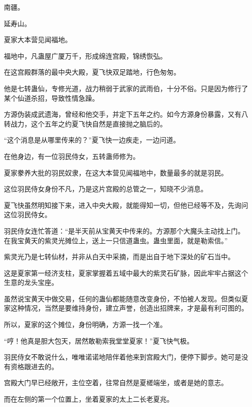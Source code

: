 
\begin{this_body}



南疆。

延寿山。

夏家大本营见闻福地。

福地中，凡蛊屋广厦万千，形成绵连宫殿，锦绣恢弘。

在这宫殿群落的最中央大殿，夏飞快双足踏地，行色匆匆。

他是七转蛊仙，专修光道，战力稍弱于武家的武雨伯，十分不俗。只是因为修行了某个仙道杀招，导致性情急躁。

方源伪装成武遗海，曾经和他交手，并定下五年之约。如今方源身份暴露，又有八转战力，这个五年之约夏飞快自然是直接抛之脑后的。

“这个消息是从哪里传来的？”夏飞快一边疾走，一边问道。

在他身边，有一位羽民侍女，五转蛊师修为。

夏家豢养大批的羽民奴隶，在这大本营见闻福地中，数量最多的就是羽民。

这位羽民侍女身份不凡，乃是这片宫殿的总管之一，知晓不少消息。

夏飞快虽然明知接下来，进入中央大殿，就能得知一切，但他已经等不及，先询问这位羽民侍女。

羽民侍女连忙答道：“是半天前从宝黄天中传来的。方源那个大魔头主动找上门。在我宝黄天的紫灵光摊位上，送上一只信道蛊虫。蛊虫里面，就是勒索信。”

紫灵光乃是七转仙材，并非从白天中采摘，而是出自于地下深处的矿石当中。

这是夏家第一经济支柱，夏家掌握着五域中最大的紫灵石矿脉，因此牢牢占据这个生意的龙头宝座。

虽然说宝黄天中做交易，任何的蛊仙都能随意改变身份，不怕被人发现。但类似夏家这种情况，当然是要维持身份，建立声誉，创造出招牌来，才是最有利可图的。

所以，夏家的这个摊位，身份明确，方源一找一个准。

“哼！他真是胆大包天，居然敢勒索我堂堂夏家！”夏飞快气极。

羽民侍女不敢说什么，唯唯诺诺地陪伴着他来到宫殿大门，便停下脚步。她可是没有资格跟进去的。

宫殿大门早已经敞开，主位空着，往常自然是夏槎端坐，或者是她的意志。

而在左侧的第一个位置上，坐着夏家的太上二长老夏兆。


\end{this_body}

